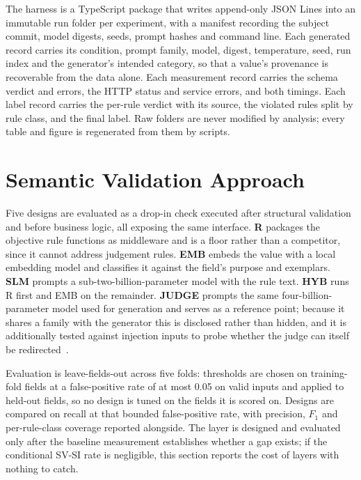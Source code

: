 \documentclass[conference]{IEEEtran}
\begin{document}
The harness is a TypeScript package that writes append-only JSON Lines into an immutable run folder
per experiment, with a manifest recording the subject commit, model digests, seeds, prompt hashes and
command line. Each generated record carries its condition, prompt family, model, digest, temperature,
seed, run index and the generator's intended category, so that a value's provenance is recoverable
from the data alone. Each measurement record carries the schema verdict and errors, the HTTP status
and service errors, and both timings. Each label record carries the per-rule verdict with its source,
the violated rules split by rule class, and the final label. Raw folders are never modified by
analysis; every table and figure is regenerated from them by scripts.

\section{Semantic Validation Approach}
\label{sec:layer}

Five designs are evaluated as a drop-in check executed after structural validation and before
business logic, all exposing the same interface. \textbf{R} packages the objective rule functions as
middleware and is a floor rather than a competitor, since it cannot address judgement rules.
\textbf{EMB} embeds the value with a local embedding model and classifies it against the field's
purpose and exemplars. \textbf{SLM} prompts a sub-two-billion-parameter model with the rule text.
\textbf{HYB} runs R first and EMB on the remainder. \textbf{JUDGE} prompts the same
four-billion-parameter model used for generation and serves as a reference point; because it shares a
family with the generator this is disclosed rather than hidden, and it is additionally tested against
injection inputs to probe whether the judge can itself be redirected~\cite{shi2024judgeattack}.

Evaluation is leave-fields-out across five folds: thresholds are chosen on training-fold fields at a
false-positive rate of at most 0.05 on valid inputs and applied to held-out fields, so no design is
tuned on the fields it is scored on. Designs are compared on recall at that bounded false-positive
rate, with precision, $F_1$ and per-rule-class coverage reported alongside. The layer is designed and
evaluated only after the baseline measurement establishes whether a gap exists; if the conditional
SV-SI rate is negligible, this section reports the cost of layers with nothing to catch.
\end{document}
